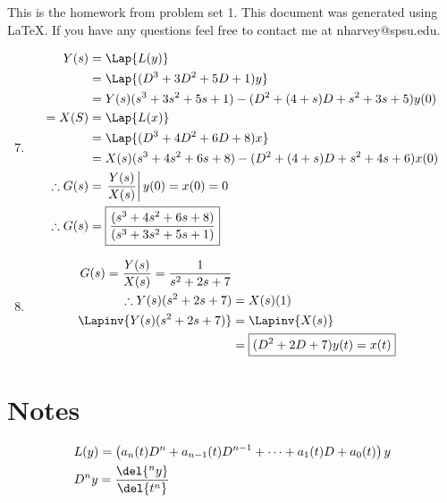 \documentclass[main.tex]{subfiles}
\begin{document}
This is the homework from problem set 1. This document was generated using
\LaTeX. If you have any questions feel free to contact me at nharvey@spsu.edu.

\begin{enumerate}
	\setcounter{enumi}{6}
	\item
		\begin{align*}
			   Y(s) &= \Lap{L(y)}
			\\ &= \Lap{(D^3+3D^2+5D+1)y}
			\\ &= Y(s)(s^3+3s^2+5s+1)-(D^2+(4+s)D+s^2+3s+5)y(0)
			\\ = X(S) &= \Lap{L(x)}
			\\ &= \Lap{(D^3+4D^2+6D+8)x}
			\\ &= X(s)(s^3+4s^2+6s+8)-(D^2+(4+s)D+s^2+4s+6)x(0)
			\\ \therefore G(s) &= \left. \frac{Y(s)}{X(s)} \right| y(0)=x(0)=0
			\\ \therefore G(s) &= \boxed{\frac{(s^3+4s^2+6s+8)}{(s^3+3s^2+5s+1)}}
		\end{align*}
	\item
		\begin{align*}
			   G(s) = \frac{Y(s)}{X(s)} = \frac{1}{s^2+2s+7}
			\\ \therefore Y(s)(s^2+2s+7) &= X(s)(1)
			\\ \Lapinv{Y(s)(s^2+2s+7)} &= \Lapinv{X(s)}
			\\ &= \boxed{(D^2+2D+7)y(t) = x(t)}
		\end{align*}
\end{enumerate}

\section*{Notes} 
\label{sec:notes}
	\begin{align*}
		  & L(y) = \left(a_n(t)D^n + a_{n-1}(t)D^{n-1} + \cdots + a_1(t)D + a_0(t) \right)y
		\\& D^{n}y = \frac{\del{^ny}}{\del{t^n}}
	\end{align*}


\end{document}

